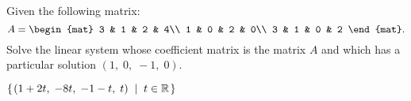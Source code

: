 
\begin{Exercise}[name={},
title={}, 
origin={\cite{BS}},
counter=Exercise]
Given the following matrix:
\[
A=
\begin{mat}
3 & 1 & 2 & 4\\
1 & 0 & 2 & 0\\
3 & 1 & 0 & 2
\end{mat}.
\]
Solve the linear system whose coefficient matrix is the matrix $A$ and which has a particular solution $(1,\; 0,\; -1,\; 0)$.
\end{Exercise}

\begin{Answer}
$\mbox{$\left\{\hspace{0.1em}(1+2t,\;-8t,\;-1-t,\;t)\;\;\middle|\;\; t\in\mathbb{R}\hspace{0.1em}\right\}$}$
\end{Answer}

